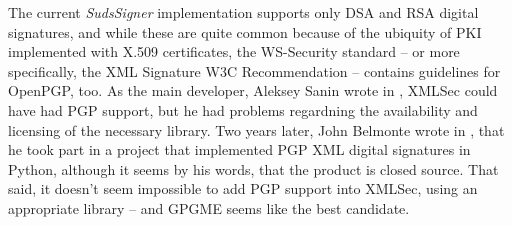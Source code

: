 The current \emph{SudsSigner} implementation supports only DSA and RSA digital signatures, and while these are quite common because of the ubiquity of PKI implemented with X.509 certificates, the WS\hyp{}Security standard -- or more specifically, the XML Signature W3C Recommendation -- contains guidelines for OpenPGP, too. As the main developer, Aleksey Sanin wrote in \cite{aleksey-pgp-mail}, XMLSec could have had PGP support, but he had problems regardning the availability and licensing of the necessary library. Two years later, John Belmonte wrote in \cite{belmonte-pgp-mail}, that he took part in a project that implemented PGP XML digital signatures in Python, although it seems by his words, that the product is closed source. That said, it doesn't seem impossible to add PGP support into XMLSec, using an appropriate library -- and GPGME \cite{gpgme-homepage} seems like the best candidate.
